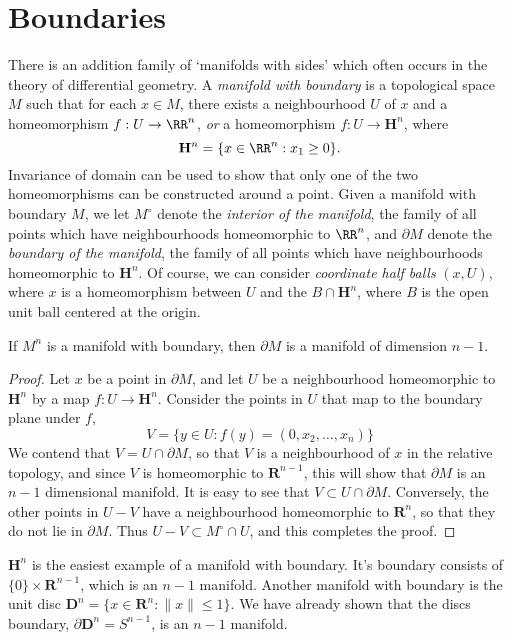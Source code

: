 \section{Boundaries}

There is an addition family of `manifolds with sides' which often occurs in the theory of differential geometry. A \emph{manifold with boundary} is a topological space $M$ such that for each $x \in M$, there exists a neighbourhood $U$ of $x$ and a homeomorphism $f:U \to \RR^n$, \emph{or} a homeomorphism $f: U \to \mathbf{H}^n$, where
%
\[ \mathbf{H}^n = \{ x \in \RR^n: x_1 \geq 0 \}. \]
%
Invariance of domain can be used to show that only one of the two homeomorphisms can be constructed around a point. Given a manifold with boundary $M$, we let $M^\circ$ denote the \emph{interior of the manifold}, the family of all points which have neighbourhoods homeomorphic to $\RR^n$, and $\partial M$ denote the \emph{boundary of the manifold}, the family of all points which have neighbourhoods homeomorphic to $\mathbf{H}^n$. Of course, we can consider \emph{coordinate half balls} $(x,U)$, where $x$ is a homeomorphism between $U$ and the $B \cap \mathbf{H}^n$, where $B$ is the open unit ball centered at the origin.

\begin{theorem}
    If $M^n$ is a manifold with boundary, then $\partial M$ is a manifold of dimension $n-1$.
\end{theorem}
\begin{proof}
    Let $x$ be a point in $\partial M$, and let $U$ be a neighbourhood homeomorphic to $\mathbf{H}^n$ by a map $f:U \to \mathbf{H}^n$. Consider the points in $U$ that map to the boundary plane under $f$,
    \[ V = \{ y \in U : f(y) = (0,x_2, \dots, x_n) \} \]
    We contend that $V = U \cap \partial M$, so that $V$ is a neighbourhood of $x$ in the relative topology, and since $V$ is homeomorphic to $\mathbf{R}^{n-1}$, this will show that $\partial M$ is an $n-1$ dimensional manifold. It is easy to see that $V \subset U \cap \partial M$. Conversely, the other points in $U - V$ have a neighbourhood homeomorphic to $\mathbf{R}^n$, so that they do not lie in $\partial M$. Thus $U - V \subset M^\circ \cap U$, and this completes the proof.
\end{proof}

\begin{example}
    $\mathbf{H}^n$ is the easiest example of a manifold with boundary. It's boundary consists of $\{ 0 \} \times \mathbf{R}^{n-1}$, which is an $n - 1$ manifold. Another manifold with boundary is the unit disc $\mathbf{D}^n = \{ x \in \mathbf{R}^n : \|x\| \leq 1 \}$. We have already shown that the discs boundary, $\partial \mathbf{D}^n = S^{n-1}$, is an $n - 1$ manifold.
\end{example}

